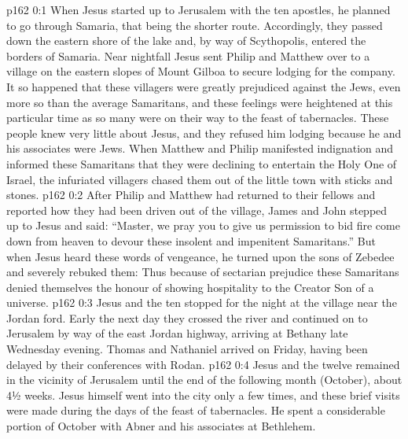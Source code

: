 \author{Midwayer Commission}
\vs p162 0:1 When Jesus started up to Jerusalem with the ten apostles, he planned to go through Samaria, that being the shorter route. Accordingly, they passed down the eastern shore of the lake and, by way of Scythopolis, entered the borders of Samaria. Near nightfall Jesus sent Philip and Matthew over to a village on the eastern slopes of Mount Gilboa to secure lodging for the company. It so happened that these villagers were greatly prejudiced against the Jews, even more so than the average Samaritans, and these feelings were heightened at this particular time as so many were on their way to the feast of tabernacles. These people knew very little about Jesus, and they refused him lodging because he and his associates were Jews. When Matthew and Philip manifested indignation and informed these Samaritans that they were declining to entertain the Holy One of Israel, the infuriated villagers chased them out of the little town with sticks and stones.
\vs p162 0:2 After Philip and Matthew had returned to their fellows and reported how they had been driven out of the village, James and John stepped up to Jesus and said: “Master, we pray you to give us permission to bid fire come down from heaven to devour these insolent and impenitent Samaritans.” But when Jesus heard these words of vengeance, he turned upon the sons of Zebedee and severely rebuked them:  Thus because of sectarian prejudice these Samaritans denied themselves the honour of showing hospitality to the Creator Son of a universe.
\vs p162 0:3 Jesus and the ten stopped for the night at the village near the Jordan ford. Early the next day they crossed the river and continued on to Jerusalem by way of the east Jordan highway, arriving at Bethany late Wednesday evening. Thomas and Nathaniel arrived on Friday, having been delayed by their conferences with Rodan.
\vs p162 0:4 \pc Jesus and the twelve remained in the vicinity of Jerusalem until the end of the following month (October), about 4½ weeks. Jesus himself went into the city only a few times, and these brief visits were made during the days of the feast of tabernacles. He spent a considerable portion of October with Abner and his associates at Bethlehem.
